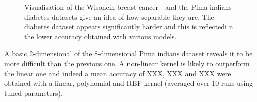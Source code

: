\begin{figure}[htp]
\centering
{}\hfil
{}\hfil
{}\hfil
{}\hfil
\caption{Visualisation of the Wisoncin breast cancer - and the Pima indians diabetes datasets give an idea of how separable they are. The diabetes dataset appears significantly harder and this is reflectedi n the lower accuracy obtained with various models.}
\label{homeviz}
\end{figure}


A basic 2-dimensional of the 8-dimensional Pima indians dataset reveals it to be more difficult than the previous one. A non-linear kernel is likely to outperform the linear one and indeed a mean accuracy of XXX, XXX and XXX were obtained with a linear, polynomial and RBF kernel (averaged over 10 runs using tuned parameters).

